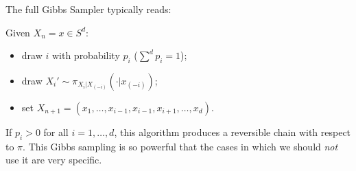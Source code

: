 \documentclass{article}
\begin{document}
	The full Gibbs Sampler typically reads:
	\begin{algorithm}
		Given $X_n = x \in S^d$:
		\begin{itemize}
			\item draw $i$ with probability $p_i $ ($\sum^d p_i = 1 $);
			\item draw $X_i'\sim \pi_{X_i|X_{(-i)}}(\cdot|x_{(-i)} )$;
			\item set $X_{n+1}=(x_1, \dots, x_{i-1},  x_{i-1}, x_{i+1}, \dots, x_d )$.
		\end{itemize}
	\end{algorithm}
	If $p_i >0$ for all $i=1, \dots, d$, this algorithm produces a reversible chain with respect to $\pi$. This Gibbs sampling is so powerful that the cases in which we should \textit{not} use it are very specific. 
\end{document}
